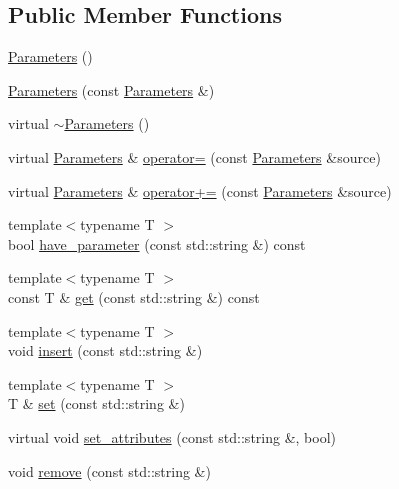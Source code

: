 \subsection*{Public Member Functions}
\begin{DoxyCompactItemize}
\item 
\mbox{\hyperlink{classfemus_1_1_parameters_a8dd2d29d6b1c5adb6584cb6a271b7f24}{Parameters}} ()
\item 
\mbox{\hyperlink{classfemus_1_1_parameters_ab0264eab475b57d22ac01ae4e180be7d}{Parameters}} (const \mbox{\hyperlink{classfemus_1_1_parameters}{Parameters}} \&)
\item 
virtual \mbox{\hyperlink{classfemus_1_1_parameters_ac4d54f25cdc1ba7c7deda53a002c787b}{$\sim$\+Parameters}} ()
\item 
virtual \mbox{\hyperlink{classfemus_1_1_parameters}{Parameters}} \& \mbox{\hyperlink{classfemus_1_1_parameters_a4c877bb7d62bd1ca6a7e42b1968718d3}{operator=}} (const \mbox{\hyperlink{classfemus_1_1_parameters}{Parameters}} \&source)
\item 
virtual \mbox{\hyperlink{classfemus_1_1_parameters}{Parameters}} \& \mbox{\hyperlink{classfemus_1_1_parameters_af7122cef76beb027360f3683fae5acd6}{operator+=}} (const \mbox{\hyperlink{classfemus_1_1_parameters}{Parameters}} \&source)
\item 
{\footnotesize template$<$typename T $>$ }\\bool \mbox{\hyperlink{classfemus_1_1_parameters_a40552ba34705d99b2a0b7419448c99b4}{have\+\_\+parameter}} (const std\+::string \&) const
\item 
{\footnotesize template$<$typename T $>$ }\\const T \& \mbox{\hyperlink{classfemus_1_1_parameters_a419ddd3d0965dbca868a5072249b8374}{get}} (const std\+::string \&) const
\item 
{\footnotesize template$<$typename T $>$ }\\void \mbox{\hyperlink{classfemus_1_1_parameters_a5024ade9b923ccb6ad31320998c12383}{insert}} (const std\+::string \&)
\item 
{\footnotesize template$<$typename T $>$ }\\T \& \mbox{\hyperlink{classfemus_1_1_parameters_a552a70edef7b7d9119b1cd4797af776b}{set}} (const std\+::string \&)
\item 
virtual void \mbox{\hyperlink{classfemus_1_1_parameters_a1e69c71e7ac3a0a6a91c65ac1d029deb}{set\+\_\+attributes}} (const std\+::string \&, bool)
\item 
void \mbox{\hyperlink{classfemus_1_1_parameters_a7f76841c9826157a5837e680cb990f94}{remove}} (const std\+::string \&)

\end{DoxyCompactItemize}
